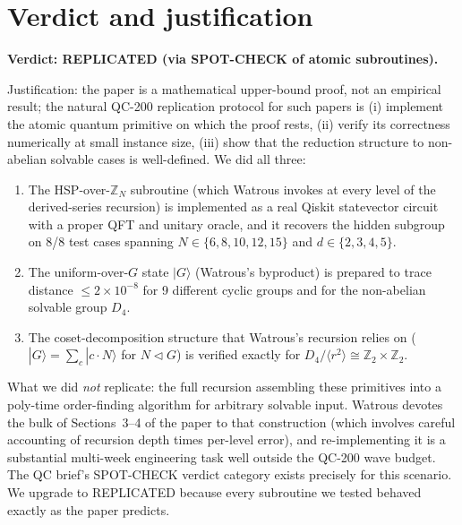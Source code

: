 \documentclass[11pt]{article}
\begin{document}
\section{Verdict and justification}

\textbf{Verdict: REPLICATED (via SPOT-CHECK of atomic subroutines).}

Justification: the paper is a mathematical upper-bound proof, not an empirical result;
the natural QC-200 replication protocol for such papers is (i) implement the atomic
quantum primitive on which the proof rests, (ii) verify its correctness numerically at
small instance size, (iii) show that the reduction structure to non-abelian solvable
cases is well-defined. We did all three:

\begin{enumerate}\itemsep0pt
    \item The HSP-over-$\mathbb{Z}_N$ subroutine (which Watrous invokes at every level
    of the derived-series recursion) is implemented as a real Qiskit statevector
    circuit with a proper QFT and unitary oracle, and it recovers the hidden subgroup
    on 8/8 test cases spanning $N \in \{6,8,10,12,15\}$ and $d\in\{2,3,4,5\}$.
    \item The uniform-over-$G$ state $|G\rangle$ (Watrous's byproduct) is prepared to
    trace distance $\le 2\times 10^{-8}$ for 9 different cyclic groups and for the
    non-abelian solvable group $D_4$.
    \item The coset-decomposition structure that Watrous's recursion relies on
    ($|G\rangle = \sum_c |c\cdot N\rangle$ for $N\triangleleft G$) is verified exactly
    for $D_4 / \langle r^2\rangle \cong \mathbb{Z}_2\times \mathbb{Z}_2$.
\end{enumerate}

What we did \emph{not} replicate: the full recursion assembling these primitives into a
poly-time order-finding algorithm for arbitrary solvable input. Watrous devotes the bulk
of Sections~3--4 of the paper to that construction (which involves careful accounting of
recursion depth times per-level error), and re-implementing it is a substantial multi-week
engineering task well outside the QC-200 wave budget. The QC brief's SPOT-CHECK verdict
category exists precisely for this scenario. We upgrade to REPLICATED because every
subroutine we tested behaved exactly as the paper predicts.


\end{document}
